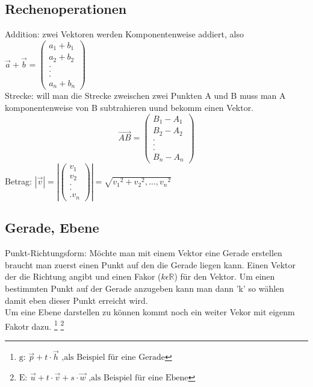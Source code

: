\documentclass[a4paper,10pt]{scrartcl}
\begin{document}
            \subsection{Rechenoperationen}
            Addition: zwei Vektoren werden Komponentenweise addiert, also \(\vec a + \vec b = 
            \begin{pmatrix}
                a_1 + b_1\\
                a_2 + b_2\\
                .\\
                .\\.\\
                a_n + b_n    
            \end{pmatrix} \)\\
            Strecke: will man die Strecke zweischen zwei Punkten A und B muss man A komponentenweise von B subtrahieren uund bekomm einen Vektor. \[\vec {AB} = 
            \begin{pmatrix}
                B_1 - A_1 \\
                B_2 - A_2\\
                .\\
                .\\.\\
                B_n - A_n  
            \end{pmatrix}\]
            Betrag:
            \(
                |\vec{v}| = 
                |\begin{pmatrix}
                    v_1 \\ v_2 \\ . \\ . \\. v_n    
                \end{pmatrix}|
                = \sqrt{{v_1}^2 + {v_2}^2, \hdots, {v_n}^2}
            \)  
        \subsection{Gerade, Ebene}
            Punkt-Richtungsform: Möchte man mit einem Vektor eine Gerade erstellen braucht man zuerst einen Punkt auf den die Gerade liegen kann. Einen Vektor der die Richtung angibt 
            und einen Fakor ($k \epsilon \mathbb{R}$) für den Vektor. Um einen bestimmten Punkt auf der Gerade anzugeben kann man dann 'k' so wählen damit eben dieser Punkt erreicht wird.\\
            Um eine Ebene darstellen zu können kommt noch ein weiter Vekor mit eigenm Fakotr dazu.  
            \footnote{\(
                \text{g: } \vec{p} + t \cdot \vec{h} \text{ ,als Beispiel für eine Gerade}  
            \)}
            \footnote{\(
                \text{E: } \vec{u} + t \cdot \vec{v} + s \cdot \vec{w}  \text{ ,als Beispiel für eine Ebene}  
            \)}
            
\end{document}
